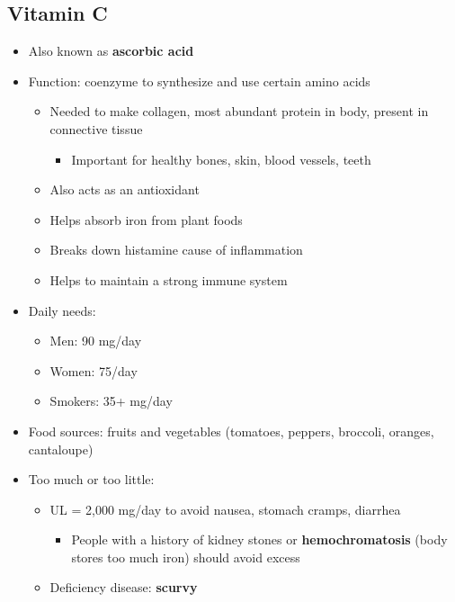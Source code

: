 \documentclass[12pt]{article}
\begin{document}
        \subsection{Vitamin C}
            \begin{itemize}
                \item Also known as \textbf{ascorbic acid}
                \item Function: coenzyme to synthesize and use certain amino acids
                    \begin{itemize}
                        \item Needed to make collagen, most abundant protein in body, present in connective tissue
                            \begin{itemize}
                                \item Important for healthy bones, skin, blood vessels, teeth
                            \end{itemize}
                        \item Also acts as an antioxidant
                        \item Helps absorb iron from plant foods
                        \item Breaks down histamine cause of inflammation
                        \item Helps to maintain a strong immune system
                    \end{itemize}
                \item Daily needs:
                    \begin{itemize}
                        \item Men: 90 mg/day
                        \item Women: 75/day
                        \item Smokers: 35+ mg/day
                    \end{itemize}
                \item Food sources: fruits and vegetables (tomatoes, peppers, broccoli, oranges, cantaloupe)
                \item Too much or too little:
                    \begin{itemize}
                        \item UL = 2,000 mg/day to avoid nausea, stomach cramps, diarrhea
                            \begin{itemize}
                                \item People with a history of kidney stones or \textbf{hemochromatosis} (body stores too much iron) should avoid excess
                            \end{itemize}
                        \item Deficiency disease: \textbf{scurvy}
                    \end{itemize}
            \end{itemize}
\end{document}
